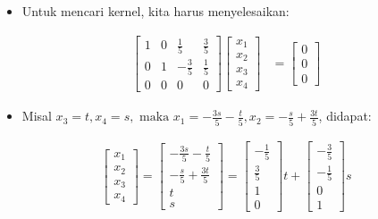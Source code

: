 \documentclass[12pt, a4paper]{scrartcl}
\begin{document}
\begin{enumerate}
\begin{enumerate}
            \begin{itemize}
                \item[] Untuk mencari kernel, kita harus menyelesaikan:
            \end{itemize}
            \begin{align*}
                \begin{bmatrix}
                    1&0&\frac{1}{5}&\frac{3}{5}\\0&1&-\frac{3}{5}&\frac{1}{5}\\0&0&0&0
                \end{bmatrix} \begin{bmatrix}
                    x_1\\x_2\\x_3\\x_4
                \end{bmatrix} &= \begin{bmatrix}
                    0\\0\\0
                \end{bmatrix}
            \end{align*}

            \begin{itemize}
                \item[] Misal $x_3 = t, x_4 = s, \mbox{ maka } x_1=-\frac{3s}{5}-\frac{t}{5}, x_2=-\frac{s}{5}+\frac{3t}{5}$, didapat:
            \end{itemize}
            \begin{align*}
                \begin{bmatrix}
                    x_1\\x_2\\x_3\\x_4
                \end{bmatrix} = \begin{bmatrix}
                    -\frac{3s}{5}-\frac{t}{5}\\-\frac{s}{5}+\frac{3t}{5}\\t\\s
                \end{bmatrix} = \begin{bmatrix}
                    -\frac{1}{5}\\\frac{3}{5}\\1\\0
                \end{bmatrix}t + \begin{bmatrix}
                    -\frac{3}{5}\\-\frac{1}{5}\\0\\1
                \end{bmatrix}s
            \end{align*}


\end{enumerate}
\end{enumerate}
\end{document}
